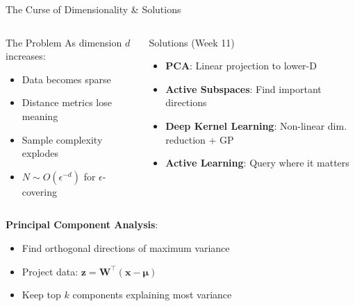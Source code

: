 \documentclass[aspectratio=169,11pt]{beamer}
\newcommand{\x}{\mathbf{x}}
\begin{document}
\begin{frame}{The Curse of Dimensionality \& Solutions}
\begin{columns}
\begin{block}{The Problem}
As dimension $d$ increases:
\begin{itemize}
    \item Data becomes sparse
    \item Distance metrics lose meaning
    \item Sample complexity explodes
    \item $N \sim O(\epsilon^{-d})$ for $\epsilon$-covering
\end{itemize}
\end{block}

\begin{block}{Solutions (Week 11)}
\begin{itemize}
    \item \textbf{PCA}: Linear projection to lower-D
    \item \textbf{Active Subspaces}: Find important directions
    \item \textbf{Deep Kernel Learning}: Non-linear dim. reduction + GP
    \item \textbf{Active Learning}: Query where it matters
\end{itemize}
\end{block}
\end{columns}

\vspace{0.5em}
\textbf{Principal Component Analysis}:
\begin{itemize}
    \item Find orthogonal directions of maximum variance
    \item Project data: $\mathbf{z} = \mathbf{W}^\top (\x - \bm{\mu})$
    \item Keep top $k$ components explaining most variance
\end{itemize}
\end{frame}
\end{document}
